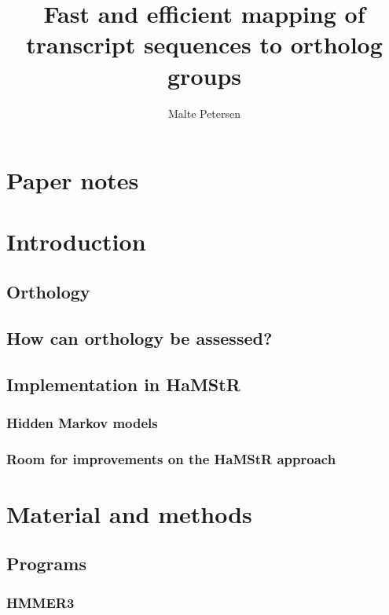 \documentclass[a4paper,13pt]{scrreprt}
\title{Fast and efficient mapping of transcript sequences to ortholog groups}
\author{Malte Petersen}
\newcommand{\hamstr}{HaMStR\xspace}
\begin{document}
\maketitle
\tableofcontents

\chapter*{Paper notes}
	



\chapter{Introduction}
	
	\section{Orthology}
		
	\section{How can orthology be assessed?}
		
	\section{Implementation in \hamstr}
		
		\subsection{Hidden Markov models}
			
		\subsection{Room for improvements on the \hamstr approach}

\chapter{Material and methods}
	\section{Programs}
		
		\subsection{HMMER3}
			
\end{document}
